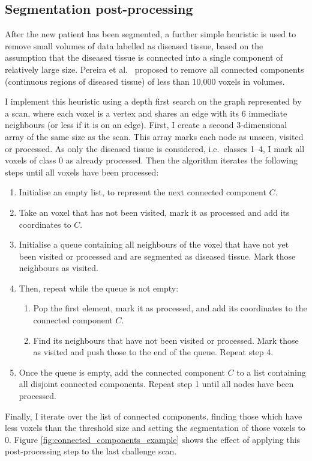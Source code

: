 \documentclass[12pt,a4paper,twoside,openright]{report}
\begin{document}
\subsection{Segmentation post-processing}
After the new patient has been segmented, a further simple heuristic is used to remove small volumes of data labelled as diseased tissue, based on the assumption that the diseased tissue is connected into a single component of relatively large size. Pereira et al.\ \cite{pereira} proposed to remove all connected components (continuous regions of diseased tissue) of less than 10,000 voxels in volumes.

I implement this heuristic using a depth first search on the graph represented by a scan, where each voxel is a vertex and shares an edge with its 6 immediate neighbours (or less if it is on an edge). First, I create a second 3-dimensional array of the same size as the scan. This array marks each node as unseen, visited or processed. As only the diseased tissue is considered, i.e.\ classes 1--4, I mark all voxels of class 0 as already processed. Then the algorithm iterates the following steps until all voxels have been processed:
\begin{enumerate}
	\item Initialise an empty list, to represent the next connected component $C$.
	\item Take an voxel that has not been visited, mark it as processed and add its coordinates to $C$.
	\item Initialise a queue containing all neighbours of the voxel that have not yet been visited or processed and are segmented as diseased tissue. Mark those neighbours as visited.
	\item Then, repeat while the queue is not empty:
	\begin{enumerate}
		\item Pop the first element, mark it as processed, and add its coordinates to the connected component $C$.
		\item Find its neighbours that have not been visited or processed. Mark those as visited and push those to the end of the queue. Repeat step 4.
	\end{enumerate}
	\item Once the queue is empty, add the connected component $C$ to a list containing all disjoint connected components. Repeat step 1 until all nodes have been processed.
\end{enumerate}
Finally, I iterate over the list of connected components, finding those which have less voxels than the threshold size and setting the segmentation of those voxels to 0. Figure \ref{fig:connected_components_example} shows the effect of applying this post-processing step to the last challenge scan.
\end{document}
